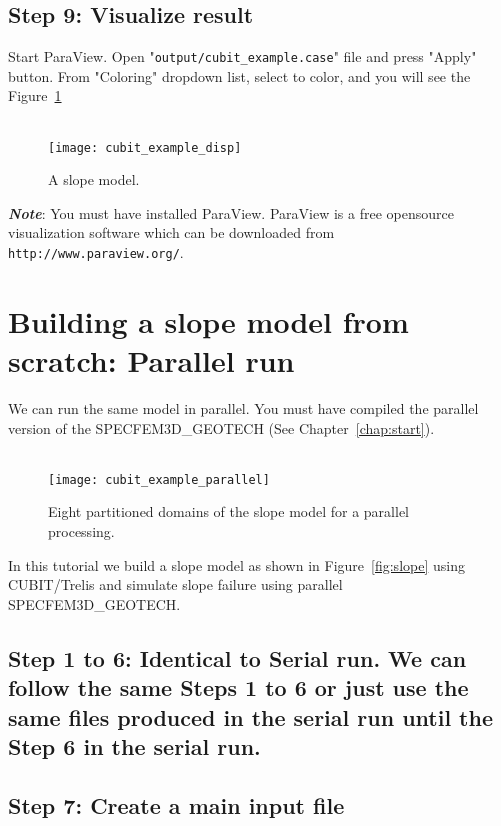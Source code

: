 \subsection*{Step 9: Visualize result}

Start ParaView. Open "\texttt{output/cubit\_example.case}" file and press "Apply" button. From "Coloring" dropdown list, select  to color, and you will see the Figure~\ref{fig:disp}\\
\\
\begin{figure}[ht]
\centering
\texttt{[image: cubit\_example\_disp]}
\caption{A slope model.}
\label{fig:disp}
\end{figure}

\textbf{\emph{Note}}: You must have installed ParaView. ParaView is a free opensource visualization software which
can be downloaded from \texttt{http://www.paraview.org/}.

\newpage

\section{Building a slope model from scratch: Parallel run}
\label{sec:pcubit}

We can run the same model in parallel. You must have compiled the parallel version of the SPECFEM3D\_GEOTECH (See Chapter~\ref{chap:start}).\\
\\
\begin{figure}[ht]
\centering
\texttt{[image: cubit\_example\_parallel]}
\caption{Eight partitioned domains of the slope model for a parallel processing.}
\label{fig:par}
\end{figure}

In this tutorial we build a slope model as shown in Figure~\ref{fig:slope} using CUBIT/Trelis and simulate slope failure using parallel SPECFEM3D\_GEOTECH.

\subsection*{Step 1 to 6: Identical to Serial run. We can follow the same Steps 1 to 6 or just use the same files produced in the serial run until the Step 6 in the serial run.}


\subsection*{Step 7: Create a main input file}

